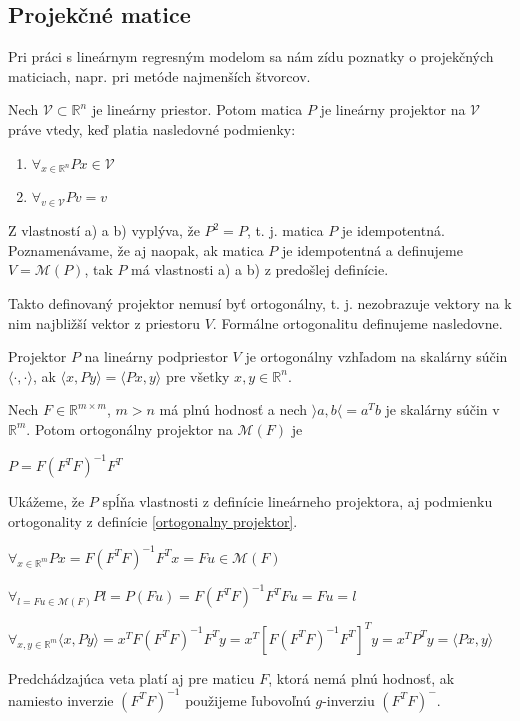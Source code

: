 \subsection{Projekčné matice}

Pri práci s lineárnym regresným modelom sa nám zídu poznatky o projekčných maticiach, napr. pri metóde najmenších štvorcov.

\begin{defin}
\label{linearny projektor}
Nech $\mathcal{V} \subset \mathbb{R}^n$ je lineárny priestor. Potom matica $P$ je lineárny projektor na $\mathcal{V}$ práve vtedy,
keď platia nasledovné podmienky:
\begin{enumerate}[label=\emph{\alph*})]
  \item
    $
    {\forall}_{x \in \mathbb{R}^n} Px \in \mathcal{V}
    $
  \item
    $
    {\forall}_{v \in \mathcal{V}} Pv = v
    $
\end{enumerate}
\end{defin}

Z vlastností a) a b) vyplýva, že $P^2 = P$, t. j. matica $P$ je idempotentná.
Poznamenávame, že aj naopak, ak matica $P$ je idempotentná a definujeme $V = \mathcal{M}(P)$, tak $P$ má vlastnosti a) a b) z predošlej definície.

Takto definovaný projektor nemusí byť ortogonálny, t. j. nezobrazuje vektory na k nim najbližší vektor z priestoru $V$.
Formálne ortogonalitu definujeme nasledovne.

\begin{defin}
\label{ortogonalny projektor}
Projektor $P$ na lineárny podpriestor $V$ je ortogonálny vzhľadom na skalárny súčin $\langle \cdot,\cdot \rangle$,
ak $\langle x, Py \rangle = \langle Px, y \rangle$ pre všetky $x, y \in \mathbb{R}^n$.
\end{defin}

\begin{theorem}
Nech $F \in \mathbb{R}^{m \times m}$, $m > n$ má plnú hodnosť a nech $\rangle a, b \langle = a^T b$ je skalárny súčin v $\mathbb{R}^m$.
Potom ortogonálny projektor na $\mathcal{M}(F)$ je
\begin{center}
$
P = F(F^T F)^{-1} F^T
$
\end{center}
\end{theorem}

\begin{dokaz}
Ukážeme, že $P$ spĺňa vlastnosti z definície lineárneho projektora, aj podmienku ortogonality z definície \ref{ortogonalny projektor}.
\begin{center}
$
{\forall}_{x \in \mathbb{R}^m} Px = F(F^T F)^{-1} F^T x = Fu \in \mathcal{M}(F)
$
\end{center}
\begin{center}
$
{\forall}_{l = Fu \in \mathcal{M}(F)} Pl = P(Fu) = F(F^T F)^{-1} F^T F u = Fu = l
$
\end{center}
\begin{center}
$
{\forall}_{x, y \in \mathbb{R}^m} \langle x, Py \rangle = x^T F(F^T F)^{-1} F^T y = x^T [F (F^T F)^{-1} F^T]^T y = x^T P^T y = \langle Px, y \rangle
$
\end{center}
\end{dokaz}

\begin{theorem}
Predchádzajúca veta platí aj pre maticu $F$, ktorá nemá plnú hodnosť,
ak namiesto inverzie $(F^T F)^{-1}$ použijeme ľubovoľnú $g$-inverziu $(F^T F)^{-}$.
\end{theorem}